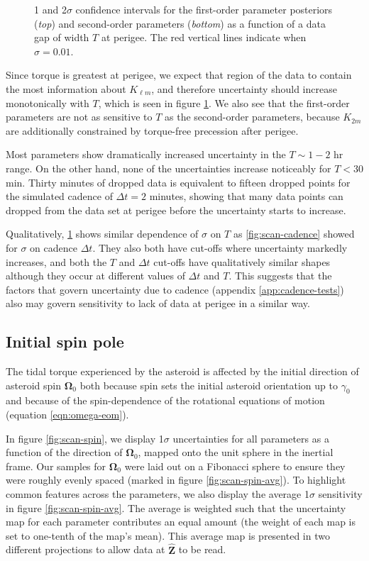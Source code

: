 \documentclass[fleqn,usenatbib]{mnras}
\newcommand{\unit}[1]{\bm{\hat{#1}}}
\begin{document}
\begin{figure}
  \caption{1 and 2$\sigma$ confidence intervals for the first-order parameter posteriors (\textit{top}) and second-order parameters (\textit{bottom}) as a function of a data gap of width $T$ at perigee. The red vertical lines indicate when $\sigma = 0.01$.}
  \label{fig:observation-gap}
\end{figure}

Since torque is greatest at perigee, we expect that region of the data to contain the most information about $K_{\ell m}$, and therefore uncertainty should increase monotonically with $T$, which is seen in figure \ref{fig:observation-gap}. We also see that the first-order parameters are not as sensitive to $T$ as the second-order parameters, because $K_{2m}$ are additionally constrained by torque-free precession after perigee.

Most parameters show dramatically increased uncertainty in the $T \sim 1-2$ hr range. On the other hand, none of the uncertainties increase noticeably for $T < 30$ min. Thirty minutes of dropped data is equivalent to fifteen dropped points for the simulated cadence of $\Delta t = 2$ minutes, showing that many data points can dropped from the data set at perigee before the uncertainty starts to increase.

Qualitatively, \ref{fig:observation-gap} shows similar dependence of $\sigma$ on $T$ as \ref{fig:scan-cadence} showed for $\sigma$ on cadence $\Delta t$. They also both have cut-offs where uncertainty markedly increases, and both the $T$ and $\Delta t$ cut-offs have qualitatively similar shapes although they occur at different values of $\Delta t$ and $T$. This suggests that the factors that govern uncertainty due to cadence (appendix \ref{app:cadence-tests}) also may govern sensitivity to lack of data at perigee in a similar way.


\subsection{Initial spin pole}
\label{sec:scan-spin}

The tidal torque experienced by the asteroid is affected by the initial direction of asteroid spin $\bm \Omega_0$ both because spin sets the initial asteroid orientation up to $\gamma_0$ and because of the spin-dependence of the rotational equations of motion (equation \ref{eqn:omega-eom}).

In figure \ref{fig:scan-spin}, we display 1$\sigma$ uncertainties for all parameters as a function of the direction of $\bm \Omega_0$, mapped onto the unit sphere in the inertial frame. Our samples for $\bm \Omega_0$ were laid out on a Fibonacci sphere to ensure they were roughly evenly spaced (marked in figure \ref{fig:scan-spin-avg}). To highlight common features across the parameters, we also display the average 1$\sigma$ sensitivity in figure \ref{fig:scan-spin-avg}. The average is weighted such that the uncertainty map for each parameter contributes an equal amount
(the weight of each map is set to one-tenth of the map's mean). This average map is presented in two different projections to allow data at $\unit Z$ to be read.
\end{document}
